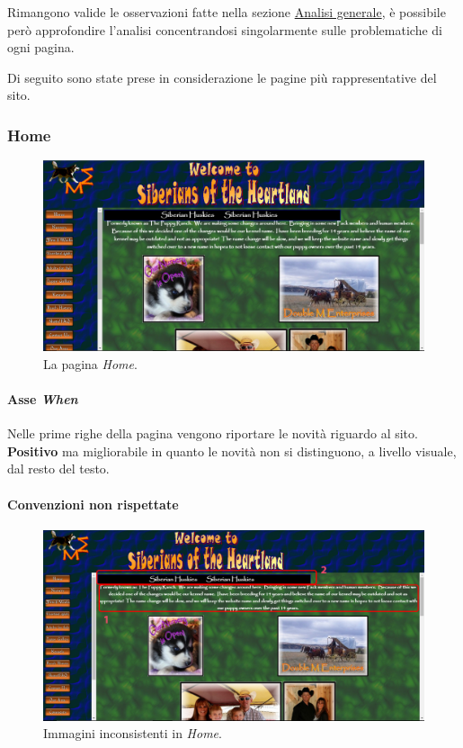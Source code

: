 \documentclass[../rapporto-usabilita.tex]{subfiles}
\begin{document}
	Rimangono valide le osservazioni fatte nella sezione \hyperref[sec:analisigenerale]{Analisi generale}, è possibile però approfondire l'analisi concentrandosi singolarmente sulle problematiche di ogni pagina.
	
	Di seguito sono state prese in considerazione le pagine più rappresentative del sito.

	\subsubsection{Home}
	
		\begin{figure}[!h]
			\centering
				\includegraphics[scale=0.33]{immagini/home.png}
					\caption{La pagina \textit{Home}.}
					\label{fig:home}
		\end{figure}	
		
		\paragraph{Asse \textit{When}}
		Nelle prime righe della pagina vengono riportare le novità riguardo al sito. \textbf{Positivo} ma migliorabile in quanto le novità non si distinguono, a livello visuale, dal resto del testo.
		
		\paragraph{Convenzioni non rispettate}
		
		\begin{figure}[!h]
			\centering
				\includegraphics[scale=0.33]{immagini/part_homepage1.jpg}
					\caption{Immagini inconsistenti in \textit{Home}.}
					\label{fig:home1}
		\end{figure}	
		
\end{document}

